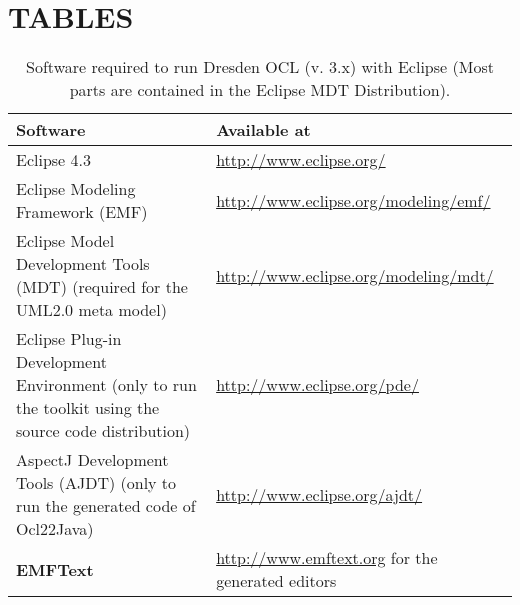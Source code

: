 \cleardoublepage
{}
{}
\chapter*{TABLES}

\begin{table}[h]
\begin{tabular}{|p{7cm}|p{7cm}|}
    \hline
    \textbf{Software} & \textbf{Available at} \\
    \hline
    Eclipse 4.3 & \url{http://www.eclipse.org/} \\
    \hline
    Eclipse Modeling Framework (EMF) & \url{http://www.eclipse.org/modeling/emf/} \\
    \hline
    Eclipse Model Development Tools (MDT) 
    \newline\footnotesize(required for the UML2.0 meta model) &
    \url{http://www.eclipse.org/modeling/mdt/} \\
    \hline
    Eclipse Plug-in Development Environment 
    \newline\footnotesize(only to run the toolkit using the source code
    distribution) & \url{http://www.eclipse.org/pde/} \\
    \hline
    AspectJ Development Tools (AJDT) 
    \newline\footnotesize(only to run the generated code of Ocl22Java) &
    \url{http://www.eclipse.org/ajdt/} \\
    \hline
    \textbf{EMFText} & \url{http://www.emftext.org}
    \newline\footnotesize{for the generated editors}
    \\
    \hline
\end{tabular}
\caption{Software required to run Dresden OCL (v. 3.x) with Eclipse \newline(Most parts are con\-tained in the Eclipse MDT Distribution).}
\label{tab:software}
\end{table}

